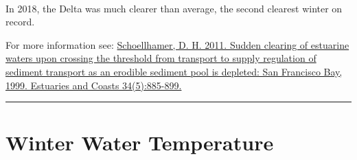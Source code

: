 \documentclass[
]{book}
\begin{document}
\begin{panel-grid}
\begin{columns-nocenter}
\begin{column800}
\end{column800}

\begin{column40}

~

\end{column40}

\begin{column800}

In 2018, the Delta was much clearer than average, the second clearest winter on record.

\end{column800}

\end{columns-nocenter}

\end{panel-grid}

\begin{disclaimer}
For more information see:
\href{https://link.springer.com/article/10.1007/s12237-011-9382-x}{Schoellhamer,
D. H. 2011. Sudden clearing of estuarine waters upon crossing the
threshold from transport to supply regulation of sediment transport as
an erodible sediment pool is depleted: San Francisco Bay, 1999.
Estuaries and Coasts 34(5):885-899.}
\end{disclaimer}

\begin{center}\rule{0.5\linewidth}{0.5pt}\end{center}

\hypertarget{winter-water-temperature}{%
\section{Winter Water Temperature}\label{winter-water-temperature}}
\end{document}
